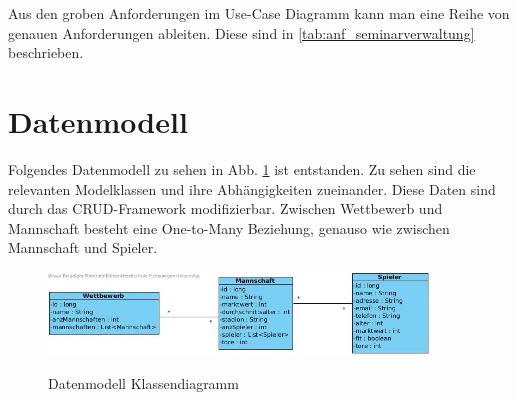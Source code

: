 Aus den groben Anforderungen im Use-Case Diagramm kann man eine Reihe von genauen Anforderungen ableiten.
Diese sind in \ref{tab:anf_seminarverwaltung} beschrieben.


\section{Datenmodell}

Folgendes Datenmodell zu sehen in Abb. \ref{pic:datamodel} ist entstanden. Zu sehen sind die relevanten Modelklassen und ihre Abhängigkeiten zueinander. 
Diese Daten sind durch das CRUD-Framework modifizierbar. Zwischen Wettbewerb und Mannschaft besteht eine One-to-Many Beziehung, genauso wie zwischen Mannschaft und Spieler.




\begin{figure}[htb!]
	\caption{Datenmodell Klassendiagramm}
	\includegraphics[width=0.9\textwidth]{content/pictures/klassendiagramm_model}
	\label{pic:datamodel}
\end{figure}


